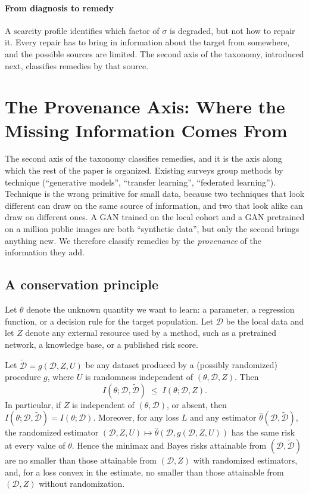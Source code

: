 \documentclass[acmsmall,screen,review]{acmart}
\theoremstyle{acmdefinition}
\begin{document}
\paragraph{From diagnosis to remedy} A scarcity profile identifies which factor of $\sigma$ is degraded, but not how to repair it. Every repair has to bring in information about the target from somewhere, and the possible sources are limited. The second axis of the taxonomy, introduced next, classifies remedies by that source.

\section{The Provenance Axis: Where the Missing Information Comes From}\label{sec:provenance}

The second axis of the taxonomy classifies remedies, and it is the axis along which the rest of the paper is organized. Existing surveys group methods by technique (``generative models'', ``transfer learning'', ``federated learning''). Technique is the wrong primitive for small data, because two techniques that look different can draw on the same source of information, and two that look alike can draw on different ones. A GAN trained on the local cohort and a GAN pretrained on a million public images are both ``synthetic data'', but only the second brings anything new. We therefore classify remedies by the \emph{provenance} of the information they add.

\subsection{A conservation principle}

Let $\theta$ denote the unknown quantity we want to learn: a parameter, a regression function, or a decision rule for the target population. Let $\mathcal{D}$ be the local data and let $Z$ denote any external resource used by a method, such as a pretrained network, a knowledge base, or a published risk score.

\begin{proposition}\label{prop:nfl}
Let $\tilde{\mathcal{D}}=g(\mathcal{D},Z,U)$ be any dataset produced by a (possibly randomized) procedure $g$, where $U$ is randomness independent of $(\theta,\mathcal{D},Z)$. Then
\[
I(\theta;\mathcal{D},\tilde{\mathcal{D}}) \;\le\; I(\theta;\mathcal{D},Z).
\]
In particular, if $Z$ is independent of $(\theta,\mathcal{D})$, or absent, then $I(\theta;\mathcal{D},\tilde{\mathcal{D}})=I(\theta;\mathcal{D})$. Moreover, for any loss $L$ and any estimator $\hat{\theta}(\mathcal{D},\tilde{\mathcal{D}})$, the randomized estimator $(\mathcal{D},Z,U)\mapsto\hat{\theta}(\mathcal{D},g(\mathcal{D},Z,U))$ has the same risk at every value of $\theta$. Hence the minimax and Bayes risks attainable from $(\mathcal{D},\tilde{\mathcal{D}})$ are no smaller than those attainable from $(\mathcal{D},Z)$ with randomized estimators, and, for a loss convex in the estimate, no smaller than those attainable from $(\mathcal{D},Z)$ without randomization.
\end{proposition}
\end{document}
